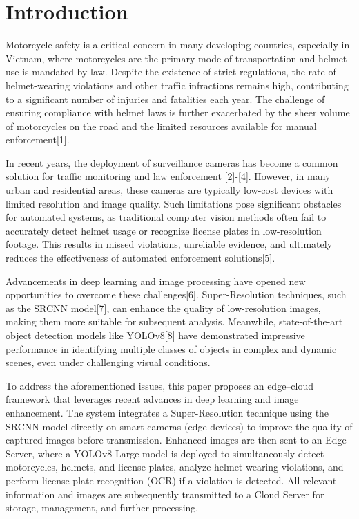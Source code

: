 \documentclass[conference]{IEEEtran}
\begin{document}
\section{Introduction}
\label{intro}

Motorcycle safety is a critical concern in many developing countries, especially in Vietnam, where motorcycles are the primary mode of transportation and helmet use is mandated by law. Despite the existence of strict regulations, the rate of helmet-wearing violations and other traffic infractions remains high, contributing to a significant number of injuries and fatalities each year. The challenge of ensuring compliance with helmet laws is further exacerbated by the sheer volume of motorcycles on the road and the limited resources available for manual enforcement[1].

In recent years, the deployment of surveillance cameras has become a common solution for traffic monitoring and law enforcement [2]-[4]. However, in many urban and residential areas, these cameras are typically low-cost devices with limited resolution and image quality. Such limitations pose significant obstacles for automated systems, as traditional computer vision methods often fail to accurately detect helmet usage or recognize license plates in low-resolution footage. This results in missed violations, unreliable evidence, and ultimately reduces the effectiveness of automated enforcement solutions[5].

Advancements in deep learning and image processing have opened new opportunities to overcome these challenges[6]. Super-Resolution techniques, such as the SRCNN model[7], can enhance the quality of low-resolution images, making them more suitable for subsequent analysis. Meanwhile, state-of-the-art object detection models like YOLOv8[8] have demonstrated impressive performance in identifying multiple classes of objects in complex and dynamic scenes, even under challenging visual conditions.

To address the aforementioned issues, this paper proposes an edge–cloud framework that leverages recent advances in deep learning and image enhancement. The system integrates a Super-Resolution technique using the SRCNN model directly on smart cameras (edge devices) to improve the quality of captured images before transmission. Enhanced images are then sent to an Edge Server, where a YOLOv8-Large model is deployed to simultaneously detect motorcycles, helmets, and license plates, analyze helmet-wearing violations, and perform license plate recognition (OCR) if a violation is detected. All relevant information and images are subsequently transmitted to a Cloud Server for storage, management, and further processing.
\end{document}
